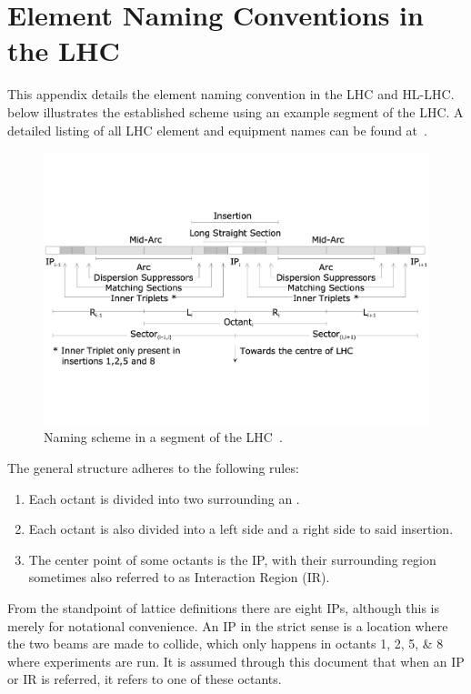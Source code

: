 \chapter{Element Naming Conventions in the LHC}
\label{appendix:naming_conventions}

This appendix details the element naming convention in the \acrshort{LHC} and \acrshort{HL-LHC}.
 below illustrates the established scheme using an example segment of the LHC.
A detailed listing of all LHC element and equipment names can be found at~\cite{CERN:Equipment_Codes}.

\begin{figure}[h]
    \centering
    \includegraphics*[width=0.9\linewidth]{Figures/Appendices/LHC_naming_scheme.pdf}
    \caption{Naming scheme in a segment of the LHC~\cite{CERN:Element_Naming}.}
    \label{figure:lhc_segment_naming_scheme}
\end{figure}

The general structure adheres to the following rules:
\begin{enumerate}
    \item Each octant is divided into two  surrounding an .
    \item Each octant is also divided into a left side and a right side to said insertion.
    \item The center point of some octants is the \gls{IP}, with their surrounding region sometimes also referred to as Interaction Region (\acrshort{IR}).
\end{enumerate}

From the standpoint of lattice definitions there are eight IPs, although this is merely for notational convenience. 
An \acrlong{IP} in the strict sense is a location where the two beams are made to collide, which only happens in octants \numlist{1;2;5;8} where \glspl{experiment} are run.
It is assumed through this document that when an IP or IR is referred, it refers to one of these octants.


